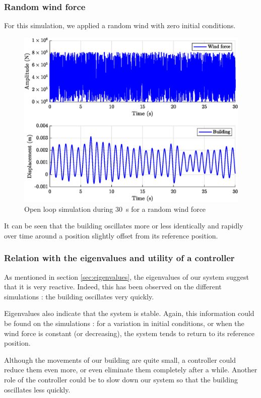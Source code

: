\subsubsection{Random wind force}
For this simulation, we applied a random wind with zero initial conditions.
\begin{figure}[H]
    \centering
    \includegraphics[width=\textwidth]{resources/eps/random-wind.eps}
    \caption{Open loop simulation during \SI{30}{\second} for a random wind force}
\end{figure}
It can be seen that the building oscillates more or less identically and rapidly over time around a position slightly offset from its reference position.

\subsubsection{Relation with the eigenvalues and utility of a controller}
As mentioned in section \ref{sec:eigenvalues}, the eigenvalues of our system suggest that it is very reactive. Indeed, this has been observed on the different simulations : the building oscillates very quickly.\par
Eigenvalues also indicate that the system is stable. Again, this information could be found on the simulations : for a variation in initial conditions, or when the wind force is constant (or decreasing), the system tends to return to its reference position.\par
Although the movements of our building are quite small, a controller could reduce them even more, or even eliminate them completely after a while. Another role of the controller could be to slow down our system so that the building oscillates less quickly.

